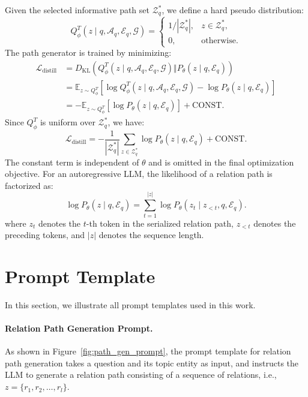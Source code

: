 \documentclass{article}
\begin{document}
Given the selected informative path set $\mathcal{Z}_q^*$, we define a hard pseudo distribution:
\begin{equation}
Q_\phi^T(z\mid q,\mathcal{A}_q,\mathcal{E}_q,\mathcal{G})
=
\begin{cases}
1/|\mathcal{Z}_q^*|, & z\in\mathcal{Z}_q^*,\\
0, & \mathrm{otherwise}.
\end{cases}
\end{equation}
The path generator is trained by minimizing:
\begin{equation}
\begin{aligned}
\mathcal{L}_{\mathrm{distill}}
&=
D_{\mathrm{KL}}
\left(
Q_\phi^T(z\mid q,\mathcal{A}_q,\mathcal{E}_q,\mathcal{G})
\Vert
P_\theta(z\mid q,\mathcal{E}_q)
\right) \\
&=
\mathbb{E}_{z\sim Q_\phi^T}
\left[
\log Q_\phi^T(z\mid q,\mathcal{A}_q,\mathcal{E}_q,\mathcal{G})
-
\log P_\theta(z\mid q,\mathcal{E}_q)
\right] \\
&=
-
\mathbb{E}_{z\sim Q_\phi^T}
\left[
\log P_\theta(z\mid q,\mathcal{E}_q)
\right]
+
\mathrm{CONST}.
\end{aligned}
\end{equation}
Since $Q_\phi^T$ is uniform over $\mathcal{Z}_q^*$, we have:
\begin{equation}
\mathcal{L}_{\mathrm{distill}}
=
-
\frac{1}{|\mathcal{Z}_q^*|}
\sum_{z\in\mathcal{Z}_q^*}
\log P_\theta(z\mid q,\mathcal{E}_q)
+
\mathrm{CONST}.
\end{equation}
The constant term is independent of $\theta$ and is omitted in the final optimization objective.
For an autoregressive LLM, the likelihood of a relation path is factorized as:
\begin{equation}
\log P_\theta(z\mid q,\mathcal{E}_q)
=
\sum_{t=1}^{|z|}
\log P_\theta(z_t\mid z_{<t},q,\mathcal{E}_q).
\end{equation}
where $z_t$ denotes the $t$-th token in the serialized relation path, $z_{<t}$ denotes the preceding tokens, and $|z|$ denotes the sequence length.


\section{Prompt Template}\label{app:prompt}


In this section, we illustrate all prompt templates used in this work.

\paragraph{Relation Path Generation Prompt.} As shown in Figure~\ref{fig:path_gen_prompt}, the prompt template for relation path generation takes a question and its topic entity as input, and instructs the LLM to generate a relation path consisting of a sequence of relations, i.e., $z = \{r_1, r_2, \ldots, r_l\}$.
\end{document}
